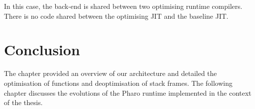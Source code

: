 \documentclass[a4paper,12pt,twoside]{../includes/ThesisStyle}
\begin{document}
In this case, the back-end is shared between two optimising runtime compilers. There is no code shared between the optimising JIT and the baseline JIT. 


\section*{Conclusion}

The chapter provided an overview of our architecture and detailed the optimisation of functions and deoptimisation of stack frames. The following chapter discusses the evolutions of the Pharo runtime implemented in the context of the thesis.

\ifx\wholebook\relax\else
    
\end{document}
